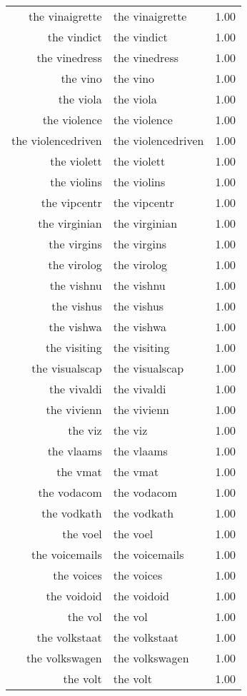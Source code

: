 \begin{table}[ht]
\begin{tabular}{rlr}
  the vinaigrette & the vinaigrette & 1.00 \\ 
  the vindict & the vindict & 1.00 \\ 
  the vinedress & the vinedress & 1.00 \\ 
  the vino & the vino & 1.00 \\ 
  the viola & the viola & 1.00 \\ 
  the violence & the violence & 1.00 \\ 
  the violencedriven & the violencedriven & 1.00 \\ 
  the violett & the violett & 1.00 \\ 
  the violins & the violins & 1.00 \\ 
  the vipcentr & the vipcentr & 1.00 \\ 
  the virginian & the virginian & 1.00 \\ 
  the virgins & the virgins & 1.00 \\ 
  the virolog & the virolog & 1.00 \\ 
  the vishnu & the vishnu & 1.00 \\ 
  the vishus & the vishus & 1.00 \\ 
  the vishwa & the vishwa & 1.00 \\ 
  the visiting & the visiting & 1.00 \\ 
  the visualscap & the visualscap & 1.00 \\ 
  the vivaldi & the vivaldi & 1.00 \\ 
  the vivienn & the vivienn & 1.00 \\ 
  the viz & the viz & 1.00 \\ 
  the vlaams & the vlaams & 1.00 \\ 
  the vmat & the vmat & 1.00 \\ 
  the vodacom & the vodacom & 1.00 \\ 
  the vodkath & the vodkath & 1.00 \\ 
  the voel & the voel & 1.00 \\ 
  the voicemails & the voicemails & 1.00 \\ 
  the voices & the voices & 1.00 \\ 
  the voidoid & the voidoid & 1.00 \\ 
  the vol & the vol & 1.00 \\ 
  the volkstaat & the volkstaat & 1.00 \\ 
  the volkswagen & the volkswagen & 1.00 \\ 
  the volt & the volt & 1.00 \\ 

\end{tabular}
\end{table}
